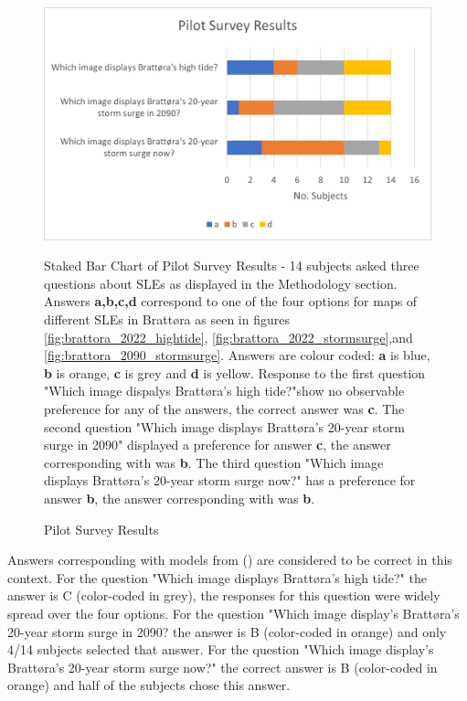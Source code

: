\begin{figure}[H]
    \centering
    \includegraphics{fig_results/pilot_survey_results.png}
    \caption{Pilot Survey Results}{Staked Bar Chart of Pilot Survey Results - 14 subjects asked three questions about SLEs as displayed in the Methodology section. Answers \textbf{a,b,c,d} correspond to one of the four options for maps of different SLEs in Brattøra as seen in figures \ref{fig:brattora_2022_hightide}, \ref{fig:brattora_2022_stormsurge},and  \ref{fig:brattora_2090_stormsurge}. Answers are colour coded: \textbf{a} is blue, \textbf{b} is orange, \textbf{c} is grey and \textbf{d} is yellow. Response to the first question "Which image dispalys Brattøra's high tide?"show no observable preference for any of the answers, the correct answer was \textbf{c}. The second question "Which image displays Brattøra's 20-year storm surge in 2090" displayed a preference for answer \textbf{c}, the answer corresponding with \cite{kartverket_se_2021} was \textbf{b}. The third question "Which image displays Brattøra's 20-year storm surge now?" has a preference for answer \textbf{b}, the answer corresponding with \cite{kartverket_se_2021} was \textbf{b}.}
    \label{fig:pilot_survey_results}
\end{figure}

 Answers corresponding with models from (\cite{kartverket_se_2021}) are considered to be correct in this context.  For the question "Which image displays Brattøra's high tide?" the answer is C (color-coded in grey), the responses for this question were widely spread over the four options. For the question "Which image display's Brattøra's 20-year storm surge in 2090? the answer is B (color-coded in orange) and only 4/14 subjects selected that answer. For the question "Which image display's Brattøra's 20-year storm surge now?" the correct answer is B (color-coded in orange) and half of the subjects chose this answer. 
